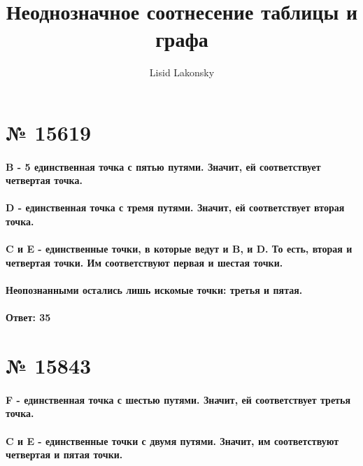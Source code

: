 \documentclass[11pt]{article} %
\title{Неоднозначное соотнесение таблицы и графа}
\author{Lisid Lakonsky}
\begin{document}
\maketitle

\section{№ \textbf{15619}}

\paragraph{B - 5 единственная точка с пятью путями. Значит, ей соответствует четвертая точка.}

\paragraph{D - единственная точка с тремя путями. Значит, ей соответствует вторая точка.}

\paragraph{C и E - единственные точки, в которые ведут и B, и D. То есть, вторая и четвертая точки. Им соответствуют первая и шестая точки.}

\paragraph{Неопознанными остались лишь искомые точки: третья и пятая.}

\paragraph{Ответ: \textbf{35}}

\section{№ \textbf{15843}}

\paragraph{F - единственная точка с шестью путями. Значит, ей соответствует третья точка.}

\paragraph{C и E - единственные точки с двумя путями. Значит, им соответствуют четвертая и пятая точки.}
\end{document}
